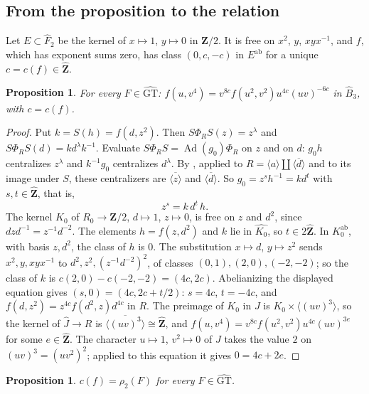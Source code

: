 \documentclass[11pt,a4paper]{article}
\theoremstyle{plain}
\newtheorem{proposition}[theorem]{Proposition}
\theoremstyle{definition}
\theoremstyle{remark}
\newcommand{\GT}{\widehat{\mathrm{GT}}}
\newcommand{\Zh}{\widehat{\mathbf Z}}
\newcommand{\Z}{\mathbf Z}
\newcommand{\Fh}{\widehat F}
\newcommand{\Bh}{\widehat B}
\newcommand{\Ad}{\operatorname{Ad}}
\newcommand{\ab}{\mathrm{ab}}
\begin{document}
\subsection*{From the proposition to the relation}
Let $E\subset\Fh_2$ be the kernel of $x\mapsto1$, $y\mapsto0$ in $\Z/2$. It is free on $x^2$, $y$, $xyx^{-1}$, and
$f$, which has exponent sums zero, has class $(0,c,-c)$ in $E^{\ab}$ for a unique $c=c(f)\in\Zh$.

\begin{proposition}\label{prop:IVc}
For every $F\in\GT$: $f(u,v^4)=v^{8c}f(u^2,v^2)u^{4c}(uv)^{-6c}$ in $\Bh_3$, with $c=c(f)$.
\end{proposition}

\begin{proof}
Put $k=S(h)=f(d,z^2)$. Then $S\Phi_RS(z)=z^\lambda$ and $S\Phi_RS(d)=kd^\lambda k^{-1}$. Evaluate
$S\Phi_RS=\Ad(g_0)\Phi_R$ on $z$ and on $d$: $g_0h$ centralizes $z^\lambda$ and $k^{-1}g_0$ centralizes
$d^\lambda$. By \cite{HR}, applied to $R=\langle a\rangle\amalg\overline{\langle d\rangle}$ and to its image under
$S$, these centralizers are $\overline{\langle z\rangle}$ and $\overline{\langle d\rangle}$. So
$g_0=z^sh^{-1}=kd^t$ with $s,t\in\Zh$, that is,
\[
 z^s=k\,d^t\,h.
\]
The kernel $K_0$ of $R_0\to\Z/2$, $d\mapsto1$, $z\mapsto0$, is free on $z$ and $d^2$, since $dzd^{-1}=z^{-1}d^{-2}$.
The elements $h=f(z,d^2)$ and $k$ lie in $\widehat{K_0}$, so $t\in2\Zh$. In $K_0^{\ab}$, with basis $z,d^2$, the
class of $h$ is $0$. The substitution $x\mapsto d$, $y\mapsto z^2$ sends $x^2,y,xyx^{-1}$ to
$d^2,z^2,(z^{-1}d^{-2})^2$, of classes $(0,1),(2,0),(-2,-2)$; so the class of $k$ is $c(2,0)-c(-2,-2)=(4c,2c)$.
Abelianizing the displayed equation gives $(s,0)=(4c,2c+t/2)$: $s=4c$, $t=-4c$, and
$f(d,z^2)=z^{4c}f(d^2,z)d^{4c}$ in $R$. The preimage of $K_0$ in $J$ is $K_0\times\langle(uv)^3\rangle$, so the
kernel of $\widehat J\to R$ is $\overline{\langle(uv)^3\rangle}\cong\Zh$, and
$f(u,v^4)=v^{8c}f(u^2,v^2)u^{4c}(uv)^{3e}$ for some $e\in\Zh$. The character $u\mapsto1$, $v^2\mapsto0$ of $J$ takes
the value $2$ on $(uv)^3=(uv^2)^2$; applied to this equation it gives $0=4c+2e$.
\end{proof}

\begin{proposition}\label{prop:c}
$c(f)=\rho_2(F)$ for every $F\in\GT$.
\end{proposition}
\end{document}
